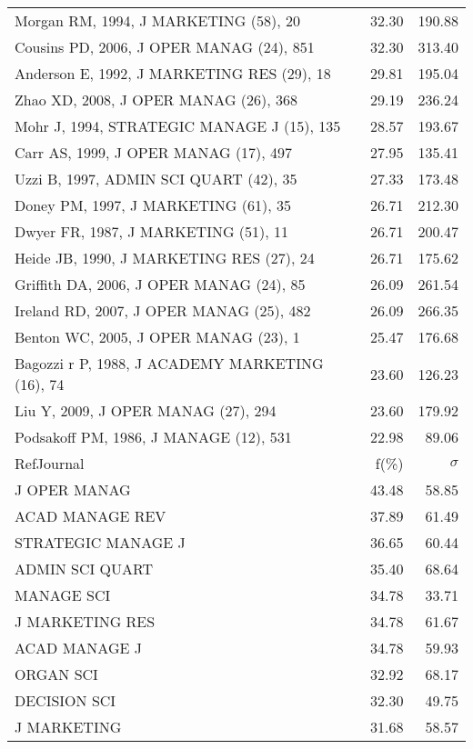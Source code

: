 \documentclass[a4paper,11pt]{report}
\begin{document}
\begin{landscape}
\begin{table}[!ht]
{\begin{tabular}{|l r r|}
Morgan RM, 1994, J MARKETING (58), 20 & 32.30 & 190.88\\
Cousins PD, 2006, J OPER MANAG (24), 851 & 32.30 & 313.40\\
Anderson E, 1992, J MARKETING RES (29), 18 & 29.81 & 195.04\\
Zhao XD, 2008, J OPER MANAG (26), 368 & 29.19 & 236.24\\
Mohr J, 1994, STRATEGIC MANAGE J (15), 135 & 28.57 & 193.67\\
Carr AS, 1999, J OPER MANAG (17), 497 & 27.95 & 135.41\\
Uzzi B, 1997, ADMIN SCI QUART (42), 35 & 27.33 & 173.48\\
Doney PM, 1997, J MARKETING (61), 35 & 26.71 & 212.30\\
Dwyer FR, 1987, J MARKETING (51), 11 & 26.71 & 200.47\\
Heide JB, 1990, J MARKETING RES (27), 24 & 26.71 & 175.62\\
Griffith DA, 2006, J OPER MANAG (24), 85 & 26.09 & 261.54\\
Ireland RD, 2007, J OPER MANAG (25), 482 & 26.09 & 266.35\\
Benton WC, 2005, J OPER MANAG (23), 1 & 25.47 & 176.68\\
Bagozzi r P, 1988, J ACADEMY MARKETING (16), 74 & 23.60 & 126.23\\
Liu Y, 2009, J OPER MANAG (27), 294 & 23.60 & 179.92\\
Podsakoff PM, 1986, J MANAGE (12), 531 & 22.98 & 89.06\\
\hline
\hline
RefJournal & f(\%) & $\sigma$\\
\hline
J OPER MANAG & 43.48 & 58.85\\
ACAD MANAGE REV & 37.89 & 61.49\\
STRATEGIC MANAGE J & 36.65 & 60.44\\
ADMIN SCI QUART & 35.40 & 68.64\\
MANAGE SCI & 34.78 & 33.71\\
J MARKETING RES & 34.78 & 61.67\\
ACAD MANAGE J & 34.78 & 59.93\\
ORGAN SCI & 32.92 & 68.17\\
DECISION SCI & 32.30 & 49.75\\
J MARKETING & 31.68 & 58.57\\
\hline
\end{tabular}
}
\end{table}

\clearpage


\end{landscape}
\end{document}
